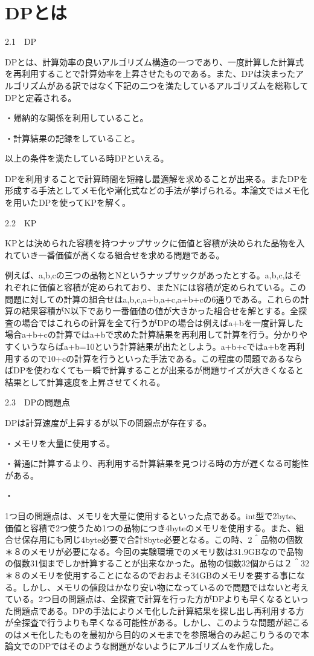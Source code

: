 \chapter{DPとは}
\label{cha:related}
2.1　DP

DPとは、計算効率の良いアルゴリズム構造の一つであり、一度計算した計算式を再利用することで計算効率を上昇させたものである。また、DPは決まったアルゴリズムがある訳ではなく下記の二つを満たしているアルゴリズムを総称してDPと定義される。

・帰納的な関係を利用していること。

・計算結果の記録をしていること。

以上の条件を満たしている時DPといえる。

DPを利用することで計算時間を短縮し最適解を求めることが出来る。またDPを形成する手法としてメモ化や漸化式などの手法が挙げられる。本論文ではメモ化を用いたDPを使ってKPを解く。

2.2　KP

KPとは決められた容積を持つナップサックに価値と容積が決められた品物を入れていき一番価値が高くなる組合せを求める問題である。

例えば、a,b,cの三つの品物とNというナップサックがあったとする。a,b,c,はそれぞれに価値と容積が定められており、またNには容積が定められている。この問題に対しての計算の組合せはa,b,c,a+b,a+c,a+b+cの6通りである。これらの計算の結果容積がN以下であり一番価値の値が大きかった組合せを解とする。全探査の場合ではこれらの計算を全て行うがDPの場合は例えばa+bを一度計算した場合a+b+cの計算ではa+bで求めた計算結果を再利用して計算を行う。分かりやすくいうならばa+b=10という計算結果が出たとしよう。a+b+cではa+bを再利用するので10+cの計算を行うといった手法である。この程度の問題であるならばDPを使わなくても一瞬で計算することが出来るが問題サイズが大きくなると結果として計算速度を上昇させてくれる。

2.3　DPの問題点

DPは計算速度が上昇するが以下の問題点が存在する。

・メモリを大量に使用する。

・普通に計算するより、再利用する計算結果を見つける時の方が遅くなる可能性がある。

・

1つ目の問題点は、メモリを大量に使用するといった点である。int型で2byte、価値と容積で2つ使うため1つの品物につき4byteのメモリを使用する。また、組合せ保存用にも同じ4byte必要で合計8byte必要となる。この時、2＾品物の個数＊８のメモリが必要になる。今回の実験環境でのメモリ数は31.9GBなので品物の個数31個までしか計算することが出来なかった。品物の個数32個からは２＾32＊８のメモリを使用することになるのでおおよそ34GBのメモリを要する事になる。しかし、メモリの値段はかなり安い物になっているので問題ではないと考えている。2つ目の問題点は、全探査で計算を行った方がDPよりも早くなるといった問題点である。DPの手法によりメモ化した計算結果を探し出し再利用する方が全探査で行うよりも早くなる可能性がある。しかし、このような問題が起こるのはメモ化したものを最初から目的のメモまでを参照場合のみ起こりうるので本論文でのDPではそのような問題がないようにアルゴリズムを作成した。
